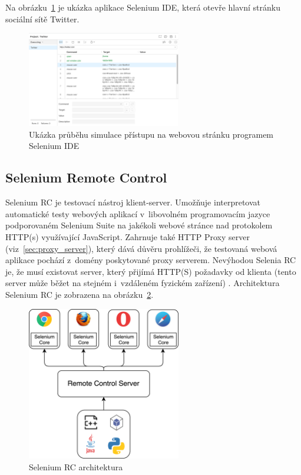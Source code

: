 Na obrázku~\ref{img:selenium_IDE} je ukázka aplikace Selenium IDE, která otevře hlavní stránku sociální sítě Twitter.

\begin{figure}[hbt]
	\centering
	\includegraphics[width=0.6\textwidth]{images/selenium_IDE.png}
	\caption{Ukázka průběhu simulace přístupu na webovou stránku programem Selenium IDE}
	\label{img:selenium_IDE}
\end{figure}

\subsection*{Selenium Remote Control}
Selenium RC je testovací nástroj klient-server. Umožňuje interpretovat automatické testy webových aplikací v~libovolném programovacím jazyce podporovaném Selenium Suite na jakékoli webové stránce nad protokolem HTTP(s) využívající JavaScript. Zahrnuje také HTTP Proxy server (viz~\ref{sec:proxy_server}), který dává důvěru prohlížeči, že testovaná webová aplikace pochází z~domény poskytované proxy serverem. Nevýhodou Selenia RC je, že musí existovat server, který přijímá HTTP(S) požadavky od klienta (tento server může běžet na stejném i~vzdáleném fyzickém zařízení) \cite{bib:selenium_tool_suite, bib:selenium_grid}. Architektura Selenium RC je zobrazena na obrázku~\ref{img:selenium_remote_control}.

\begin{figure}[hbt]
	\centering
	\includegraphics[width=0.6\textwidth]{images/selenium_remote_control.png}
	\caption{Selenium RC architektura}
	\label{img:selenium_remote_control}
\end{figure}

